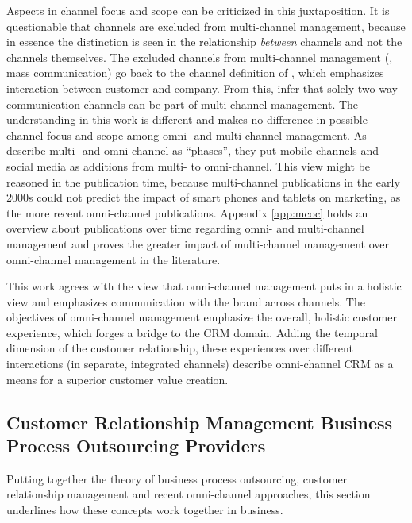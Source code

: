 	 Aspects in channel focus and scope can be criticized in this juxtaposition. It is questionable that channels are excluded from multi-channel management, because in essence the distinction is seen in the relationship \textit{between} channels and not the channels themselves. The excluded channels from multi-channel management (\viz, mass communication) go back to the channel definition of \cite{Neslin2006}, which emphasizes interaction between customer and company. From this, \citeauthor{vorhoef2015retail} infer that solely two-way communication channels can be part of multi-channel management. The understanding in this work is different and makes no difference in possible channel focus and scope among omni- and multi-channel management. As \citeauthor{vorhoef2015retail} describe multi- and omni-channel as \enquote{phases}, they put mobile channels and social media as additions from multi- to omni-channel. This view might be reasoned in the publication time, because multi-channel publications in the early 2000s could not predict the impact of smart phones and tablets on marketing, as the more recent omni-channel publications. Appendix \ref{app:mcoc} holds an overview about publications over time regarding omni- and multi-channel management and proves the greater impact of multi-channel management over omni-channel management in the literature. 
	 
	 This work agrees with the view that omni-channel management puts in a holistic view and emphasizes communication with the brand across channels. The objectives of omni-channel management emphasize the overall, holistic customer experience, which forges a bridge to the \acrshort{CRM} domain. Adding the temporal dimension of the customer relationship, these experiences over different interactions (in separate, integrated channels) describe omni-channel \acrshort{CRM} as a means for a superior customer value creation. 
	 
	
		\subsection{Customer Relationship Management Business Process Outsourcing Providers}
		\label{sec:bpocrmis}
		Putting together the theory of business process outsourcing, customer relationship management and recent omni-channel approaches, this section underlines how these concepts work together in business. 
		

